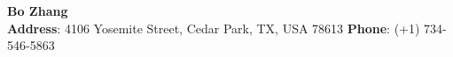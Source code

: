 \documentclass[12pt]{res}
\newcommand{\style}[1]{\color{Blue}\large\textsc{#1}}
\begin{document}
\begin{center}

\textbf{\LARGE Bo Zhang}\\
\hspace{-1.35cm}
{\indent \bf Address}: 4106 Yosemite Street, Cedar Park,  TX, USA 78613 \hfill {\bf Phone}: (+1) 734-546-5863\\
\end{center}


\begin{resume}




\end{resume}
\end{document}
